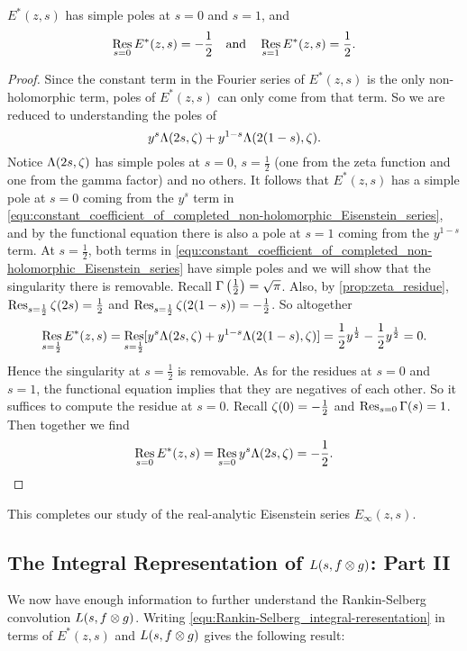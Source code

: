       \begin{proposition}\label{equ:completed_real-analytic_Eisenstein_series_residues}
        $E^{\ast}(z,s)$ has simple poles at $s = 0$ and $s = 1$, and
        \[
          \operatorname*{\mathrm{Res}}_{s = 0}E^{\ast}(z,s) = -\frac{1}{2} \quad \text{and} \quad \operatorname*{\mathrm{Res}}_{s = 1}E^{\ast}(z,s) = \frac{1}{2}.
        \]
      \end{proposition}
      \begin{proof}
        Since the constant term in the Fourier series of $E^{\ast}(z,s)$ is the only non-holomorphic term, poles of $E^{\ast}(z,s)$ can only come from that term. So we are reduced to understanding the poles of
        \begin{equation}\label{equ:constant_coefficient_of_completed_non-holomorphic_Eisenstein_series}
            y^{s}\Lambda(2s,\zeta)+y^{1-s}\Lambda(2(1-s),\zeta).
        \end{equation}
        Notice $\Lambda(2s,\zeta)$ has simple poles at $s = 0$, $s = \frac{1}{2}$ (one from the zeta function and one from the gamma factor) and no others. It follows that $E^{\ast}(z,s)$ has a simple pole at $s = 0$ coming from the $y^{s}$ term in
        \cref{equ:constant_coefficient_of_completed_non-holomorphic_Eisenstein_series}, and by the functional equation there is also a pole at $s = 1$ coming from the $y^{1-s}$ term. At $s = \frac{1}{2}$, both terms in \cref{equ:constant_coefficient_of_completed_non-holomorphic_Eisenstein_series} have simple poles and we will show that the singularity there is removable. Recall $\Gamma\left(\frac{1}{2}\right) = \sqrt{\pi}$. Also, by \cref{prop:zeta_residue}, $\operatorname*{\mathrm{Res}}_{s = \frac{1}{2}}\zeta(2s) = \frac{1}{2}$ and $\operatorname*{\mathrm{Res}}_{s = \frac{1}{2}}\zeta(2(1-s)) = -\frac{1}{2}$. So altogether
        \[
          \operatorname*{\mathrm{Res}}_{s = \frac{1}{2}}E^{\ast}(z,s) = \operatorname*{\mathrm{Res}}_{s = \frac{1}{2}}[y^{s}\Lambda(2s,\zeta)+y^{1-s}\Lambda(2(1-s),\zeta)] = \frac{1}{2}y^{\frac{1}{2}}-\frac{1}{2}y^{\frac{1}{2}} = 0.
        \]
        Hence the singularity at $s = \frac{1}{2}$ is removable. As for the residues at $s = 0$ and $s = 1$, the functional equation implies that they are negatives of each other. So it suffices to compute the residue at $s = 0$. Recall $\zeta(0) = -\frac{1}{2}$ and $\operatorname*{\mathrm{Res}}_{s = 0}\Gamma(s) = 1$. Then together we find
        \[
          \operatorname*{\mathrm{Res}}_{s = 0}E^{\ast}(z,s) = \operatorname*{\mathrm{Res}}_{s = 0}y^{s}\Lambda(2s,\zeta) = -\frac{1}{2}.
        \]
      \end{proof}

      This completes our study of the real-analytic Eisenstein series $E_{\infty}(z,s)$.
    \subsection*{The Integral Representation of \texorpdfstring{$L(s,f \otimes g)$}{L(s,f \ox g)}: Part II}
      We now have enough information to further understand the Rankin-Selberg convolution $L(s,f \otimes g)$. Writing \cref{equ:Rankin-Selberg_integral-reresentation} in terms of $E^{\ast}(z,s)$ and $L(s,f \otimes g)$ gives the following result:

